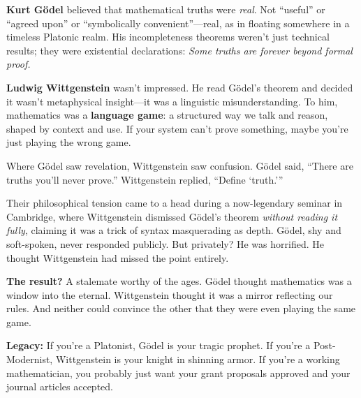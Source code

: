 \begin{tcolorbox}[colback=blue!5!white, colframe=blue!50!black, title=Historical Sidebar: Truth vs Games]

  \textbf{Kurt Gödel} believed that mathematical truths were \emph{real}. Not “useful” or “agreed upon” or “symbolically convenient”—real, as in floating somewhere in a timeless Platonic realm. His incompleteness theorems weren’t just technical results; they were existential declarations: \emph{Some truths are forever beyond formal proof.}
  
  \medskip
  
  \textbf{Ludwig Wittgenstein} wasn’t impressed.  He read Gödel’s theorem and decided it wasn’t metaphysical insight—it was a linguistic misunderstanding. To him, mathematics was a \textbf{language game}: a structured way we talk and reason, shaped by context and use. If your system can’t prove something, maybe you’re just playing the wrong game.
  
  \medskip
  
  Where Gödel saw revelation, Wittgenstein saw confusion. Gödel said, “There are truths you’ll never prove.” Wittgenstein replied, “Define ‘truth.’”
  
  \medskip
  
  Their philosophical tension came to a head during a now-legendary seminar in Cambridge, where Wittgenstein dismissed Gödel’s theorem \emph{without reading it fully}, claiming it was a trick of syntax masquerading as depth. Gödel, shy and soft-spoken, never responded publicly. But privately? He was horrified. He thought Wittgenstein had missed the point entirely.
  
  \medskip
  
  \textbf{The result?} A stalemate worthy of the ages.  Gödel thought mathematics was a window into the eternal.  Wittgenstein thought it was a mirror reflecting our rules.  And neither could convince the other that they were even playing the same game.
  
  \medskip
  
  \textbf{Legacy:}  
  If you're a Platonist, Gödel is your tragic prophet.  If you're a Post-Modernist, Wittgenstein is your knight in shinning armor. If you're a working mathematician, you probably just want your grant proposals approved and your journal articles accepted.
  
\end{tcolorbox}

\vspace{1em}


